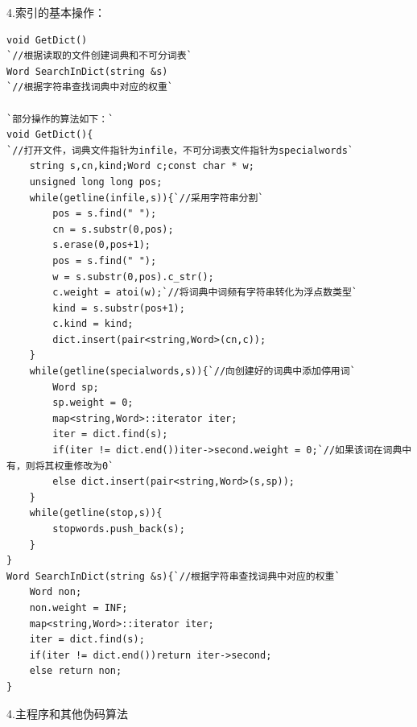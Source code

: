 \documentclass[UTF8]{ctexart}
\begin{document}
4.索引的基本操作：\par
\begin{lstlisting}
void GetDict()
`//根据读取的文件创建词典和不可分词表`
Word SearchInDict(string &s)
`//根据字符串查找词典中对应的权重`

`部分操作的算法如下：`
void GetDict(){
`//打开文件，词典文件指针为infile，不可分词表文件指针为specialwords`
    string s,cn,kind;Word c;const char * w;
    unsigned long long pos;
    while(getline(infile,s)){`//采用字符串分割`
        pos = s.find(" ");
        cn = s.substr(0,pos);
        s.erase(0,pos+1);
        pos = s.find(" ");
        w = s.substr(0,pos).c_str();
        c.weight = atoi(w);`//将词典中词频有字符串转化为浮点数类型`
        kind = s.substr(pos+1);
        c.kind = kind;
        dict.insert(pair<string,Word>(cn,c));
    }
    while(getline(specialwords,s)){`//向创建好的词典中添加停用词`
        Word sp;
        sp.weight = 0;
        map<string,Word>::iterator iter;
        iter = dict.find(s);
        if(iter != dict.end())iter->second.weight = 0;`//如果该词在词典中有，则将其权重修改为0`
        else dict.insert(pair<string,Word>(s,sp));
    }
	while(getline(stop,s)){
        stopwords.push_back(s);
    }
}
Word SearchInDict(string &s){`//根据字符串查找词典中对应的权重`
    Word non;
    non.weight = INF;
    map<string,Word>::iterator iter;
    iter = dict.find(s);
    if(iter != dict.end())return iter->second;
    else return non;
}
\end{lstlisting}
4.主程序和其他伪码算法
\end{document}
